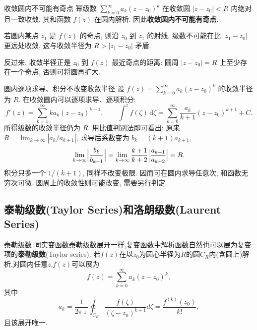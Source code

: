 \documentclass[fontset=windows, chinese, 10pt]{beamer}
\begin{document}
  \begin{frame}{收敛圆内不可能有奇点}
  \small
幂级数 $\sum_{k=0}^{\infty}a_k(z-z_0)^k$ 在收敛圆 $|z-z_0|<R$ 内绝对且一致收敛,
其和函数 $f(z)$ 在圆内解析. 因此\textbf{收敛圆内不可能有奇点}.

若圆内某点 $z_1$ 是 $f(z)$ 的奇点, 则沿 $z_0$ 到 $z_1$ 的射线,
级数不可能在比 $|z_1-z_0|$ 更远处收敛, 这与收敛半径为 $R>|z_1-z_0|$ 矛盾.

反过来, 收敛半径正是 $z_0$ 到 $f(z)$ 最近奇点的距离:
圆周 $|z-z_0|=R$ 上至少存在一个奇点, 否则可将圆再扩大.

  \end{frame}

  \begin{frame}{圆内逐项求导、积分不改变收敛半径}
  \small
设 $f(z)=\sum_{k=0}^{\infty}a_k(z-z_0)^k$ 的收敛半径为 $R$.
在收敛圆内可以逐项求导、逐项积分:
\begin{equation}
f'(z)=\sum_{k=1}^{\infty}k a_k(z-z_0)^{k-1},\qquad
\int^{z}f(\zeta)\,\mathrm{d}\zeta
=\sum_{k=0}^{\infty}\frac{a_k}{k+1}(z-z_0)^{k+1}+C.
\end{equation}
所得级数的收敛半径仍为 $R$.
用比值判别法即可看出: 原来 $R=\lim_{k\to\infty}|a_k/a_{k+1}|$,
求导后系数变为 $b_k=(k+1)a_{k+1}$,
\begin{equation}
\lim_{k\to\infty}\Bigl|\frac{b_k}{b_{k+1}}\Bigr|
=\lim_{k\to\infty}\frac{k+1}{k+2}\Bigl|\frac{a_{k+1}}{a_{k+2}}\Bigr|=R.
\end{equation}
积分只多一个 $1/(k+1)$, 同样不改变极限. 因而可在圆内求导任意次, 和函数无穷次可微.
圆周上的收敛性则可能改变, 需要另行判定.
  \end{frame}

\subsection{泰勒级数(Taylor Series)和洛朗级数(Laurent Series)}

\label{subsec:taylor_laurent_series}
\begin{frame}{泰勒级数}
\small
同实变函数泰勒级数展开一样,复变函数中解析函数自然也可以展为复变项的\textbf{泰勒级数}(Taylor series).
若$f(z)$在以$z_0$为圆心半径为$R$的圆$C_R$内(含圆上)解析,对圆内任意$z$,$f(z)$可以展为
\begin{equation}
    f(z) = \sum_{k=0}^{\infty} a_k (z-z_0)^k,
\end{equation}
其中
\begin{equation}
    a_k=\frac{1}{2 \pi \imath} \oint_{C_{R}} \frac{f(\zeta)}{\left(\zeta-z_0\right)^{k+1}} d \zeta
    =\frac{f^{(k)}\left(z_0\right)}{k !} ,
\end{equation}
且该展开唯一.

\end{frame}
  
\end{document}
